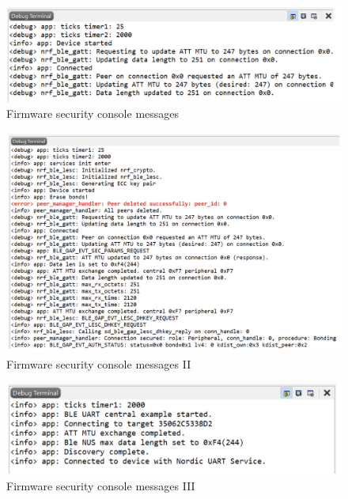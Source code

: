 \documentclass{Configuration_Files/PoliMi3i_thesis}
\begin{document}
\begin{figure}[h]
    \centering
    \includegraphics[scale=0.3]{Firmware_security/Screenshot 2024-07-22 at 22.33.24.png}
    \caption{Firmware security console messages}
    \label{firm_sec_2}
\end{figure}

\begin{figure}[h]
    \centering
    \includegraphics[scale=0.3]{Firmware_security/Screenshot 2024-07-22 at 22.33.31.png}
    \caption{Firmware security console messages II}
    \label{firm_sec_3}
\end{figure}

\begin{figure}[h]
    \centering
    \includegraphics[scale=0.3]{Firmware_security/Screenshot 2024-07-22 at 22.33.37.png}
    \caption{Firmware security console messages III}
    \label{firm_sec_4}
\end{figure}
\end{document}
